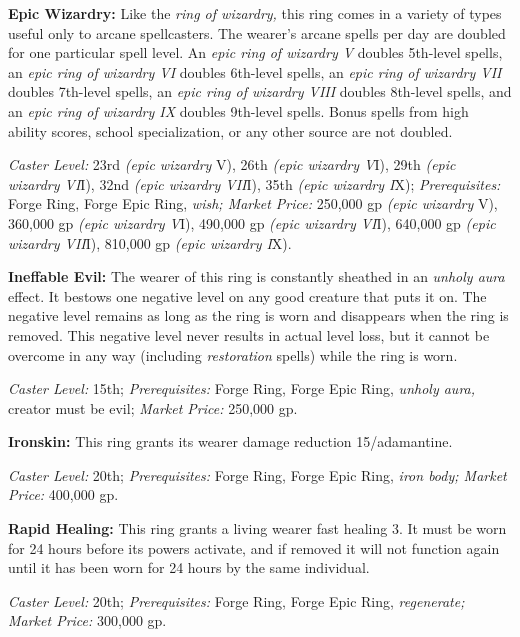 \documentclass{article}
\begin{document}
\textbf{Epic Wizardry: }Like the \textit{ring of wizardry, }this ring comes in 
a variety of types useful only to arcane spellcasters. The wearer's arcane spells 
per day are doubled for one particular spell level. An \textit{epic ring of wizardry 
V }doubles 5th-level spells, an \textit{epic ring of wizardry VI }doubles 6th-level 
spells, an \textit{epic ring of wizardry VII }doubles 7th-level spells, an \textit{epic 
ring of wizardry VIII }doubles 8th-level spells, and an \textit{epic ring of wizardry 
IX }doubles 9th-level spells. Bonus spells from high ability scores, school specialization, 
or any other source are not doubled. 

\textit{Caster Level: }23rd \textit{(epic wizardry }V), 26th \textit{(epic wizardry 
V}I), 29th \textit{(epic wizardry VI}I), 32nd \textit{(epic wizardry VII}I), 35th 
\textit{(epic wizardry I}X); \textit{Prerequisites: }Forge Ring, Forge Epic Ring, 
\textit{wish; Market Price: }250,000 gp \textit{(epic wizardry }V), 360,000 gp 
\textit{(epic wizardry V}I), 490,000 gp \textit{(epic wizardry VI}I), 640,000 gp 
\textit{(epic wizardry VII}I), 810,000 gp \textit{(epic wizardry I}X). 

\textbf{Ineffable Evil: }The wearer of this ring is constantly sheathed in an \textit{unholy 
aura }effect. It bestows one negative level on any good creature that puts it on. 
The negative level remains as long as the ring is worn and disappears when the 
ring is removed. This negative level never results in actual level loss, but it 
cannot be overcome in any way (including \textit{restoration }spells) while the 
ring is worn. 

\textit{Caster Level: }15th; \textit{Prerequisites: }Forge Ring, Forge Epic Ring, 
\textit{unholy aura, }creator must be evil; \textit{Market Price: }250,000 gp. 

\textbf{Ironskin: }This ring grants its wearer damage reduction 15/adamantine. 

\textit{Caster Level: }20th; \textit{Prerequisites: }Forge Ring, Forge Epic Ring, 
\textit{iron body; Market Price: }400,000 gp. 

\textbf{Rapid Healing: }This ring grants a living wearer fast healing 3. It must 
be worn for 24 hours before its powers activate, and if removed it will not function 
again until it has been worn for 24 hours by the same individual. 

\textit{Caster Level: }20th; \textit{Prerequisites: }Forge Ring, Forge Epic Ring, 
\textit{regenerate; Market Price: }300,000 gp. 
\end{document}
